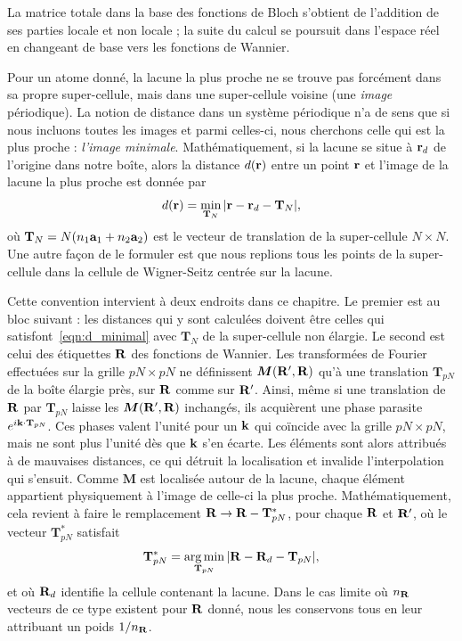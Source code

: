 La matrice totale dans la base des fonctions de Bloch s'obtient de l'addition de ses parties locale et non locale ; la suite du calcul se poursuit dans l'espace réel en changeant de base vers les fonctions de Wannier.

\bigskip
{}

Pour un atome donné, la lacune la plus proche ne se trouve pas forcément dans sa propre super-cellule, mais dans une super-cellule voisine (une \textit{image} périodique). La notion de distance dans un système périodique n'a de sens que si nous incluons toutes les images et parmi celles-ci, nous cherchons celle qui est la plus proche : \textit{l'image minimale}. Mathématiquement, si la lacune se situe à $\mathbf{r}_d$ de l'origine dans notre boîte, alors la distance $d(\mathbf{r})$ entre un point $\mathbf{r}$ et l'image de la lacune la plus proche est donnée par
\begin{equation}
    d(\mathbf{r}) =\min_{\mathbf{T}_N}|\mathbf{r}-\mathbf{r}_d-\mathbf{T}_N|,\label{eqn:d_minimal}
\end{equation}
où $\mathbf{T}_N = N(n_1\mathbf{a}_1+n_2\mathbf{a}_2)$ est le vecteur de translation de la super-cellule $N\times N$. Une autre façon de le formuler est que nous replions tous les points de la super-cellule dans la cellule de Wigner-Seitz centrée sur la lacune.

Cette convention intervient à deux endroits dans ce chapitre. Le premier est au bloc suivant : les distances qui y sont calculées doivent être celles qui satisfont~\eqref{eqn:d_minimal} avec $\mathbf{T}_{N}$ de la super-cellule non élargie. Le second est celui des étiquettes $\mathbf{R}$ des fonctions de Wannier. Les transformées de Fourier effectuées sur la grille $pN\times pN$ ne définissent $\bm M(\mathbf{R}',\mathbf{R})$ qu'à une translation $\mathbf{T}_{pN}$ de la boîte élargie près, sur $\mathbf{R}$ comme sur $\mathbf{R}'$. Ainsi, même si une translation de $\mathbf{R}$ par $\mathbf{T}_{pN}$ laisse les $\bm M(\mathbf{R}',\mathbf{R})$ inchangés, ils acquièrent une phase parasite $e^{ i\mathbf{k}\cdot\mathbf{T}_{pN}}$. Ces phases valent l'unité pour un $\mathbf{k}$ qui coïncide avec la grille $pN\times pN$, mais ne sont plus l'unité dès que $\mathbf{k}$ s'en écarte. Les éléments sont alors attribués à de mauvaises distances, ce qui détruit la localisation et invalide l'interpolation qui s'ensuit. Comme $\bm M$ est localisée autour de la lacune, chaque élément appartient physiquement à l'image de celle-ci la plus proche. Mathématiquement, cela revient à faire le remplacement $\mathbf{R}\to\mathbf{R}-\mathbf{T}^*_{pN}$, pour chaque $\mathbf{R}$ et $\mathbf{R}'$, où le vecteur $\mathbf{T}^*_{pN}$ satisfait
\begin{equation}
\mathbf{T}_{pN}^* = \operatorname*{arg\,min}_{\mathbf{T}_{pN}}|\mathbf{R}-\mathbf{R}_d -\mathbf{T}_{pN}|,\label{eqn:T_star}
\end{equation}
et où $\mathbf{R}_d$ identifie la cellule contenant la lacune. Dans le cas limite où $n_{\mathbf{R}}$ vecteurs de ce type existent pour $\mathbf{R}$ donné, nous les conservons tous en leur attribuant un poids $1/n_{\mathbf{R}}$.

